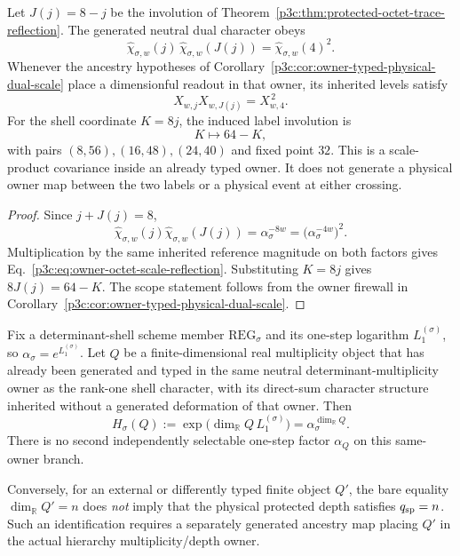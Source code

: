 \documentclass[12pt,a4paper]{article}
\begin{document}
\begin{corollary}
\label{p3c:cor:owner-typed-octet-scale-reflection}
Let \(J(j)=8-j\) be the involution of
Theorem~\ref{p3c:thm:protected-octet-trace-reflection}.  The generated neutral
dual character obeys
\begin{equation}
\label{p3c:eq:neutral-octet-scale-reflection}
 \boxed{
 \widehat\chi_{\sigma,w}(j)\,\widehat\chi_{\sigma,w}(J(j))
 =\widehat\chi_{\sigma,w}(4)^2.}
\end{equation}
Whenever the ancestry hypotheses of
Corollary~\ref{p3c:cor:owner-typed-physical-dual-scale} place a dimensionful
readout in that owner, its inherited levels satisfy
\begin{equation}
\label{p3c:eq:owner-octet-scale-reflection}
 \boxed{X_{w,j}X_{w,J(j)}=X_{w,4}^{\,2}.}
\end{equation}
For the shell coordinate \(K=8j\), the induced label involution is
\begin{equation}
\label{p3c:eq:shell-octet-reflection}
 \boxed{K\longmapsto64-K,}
\end{equation}
with pairs \((8,56),(16,48),(24,40)\) and fixed point \(32\).
This is a scale-product covariance inside an already typed owner.  It does
not generate a physical owner map between the two labels or a physical event
at either crossing.
\end{corollary}

\begin{proof}
Since \(j+J(j)=8\),
\[
 \widehat\chi_{\sigma,w}(j)\widehat\chi_{\sigma,w}(J(j))
 =\alpha_\sigma^{-8w}
 =\bigl(\alpha_\sigma^{-4w}\bigr)^2.
\]
Multiplication by the same inherited reference magnitude on both factors
gives Eq.~\eqref{p3c:eq:owner-octet-scale-reflection}.  Substituting
\(K=8j\) gives \(8J(j)=64-K\).  The scope statement follows from the owner
firewall in Corollary~\ref{p3c:cor:owner-typed-physical-dual-scale}.
\end{proof}


\begin{corollary}
\label{p3c:cor:typed-determinant-owner-inheritance}
Fix a determinant-shell scheme member \(\mathrm{REG}_\sigma\) and its one-step
logarithm \(L_1^{(\sigma)}\), so
\(\alpha_\sigma=e^{L_1^{(\sigma)}}\).  Let \(Q\) be a finite-dimensional real
multiplicity object that has already been generated and typed in the same
neutral determinant-multiplicity owner as the rank-one shell character, with
its direct-sum character structure inherited without a generated deformation
of that owner.  Then
\[
 \boxed{
 H_\sigma(Q)
 :=\exp\!\bigl(\dim_{\mathbb R}Q\,L_1^{(\sigma)}\bigr)
 =\alpha_\sigma^{\dim_{\mathbb R}Q}.}
\]
There is no second independently selectable one-step factor \(\alpha_Q\) on
this same-owner branch.

Conversely, for an external or differently typed finite object \(Q'\), the
bare equality \(\dim_{\mathbb R}Q'=n\) does \emph{not} imply that the physical
protected depth satisfies \(q_{\rm sp}=n\).  Such an identification requires a
separately generated ancestry map placing \(Q'\) in the actual hierarchy
multiplicity/depth owner.
\end{corollary}
\end{document}
